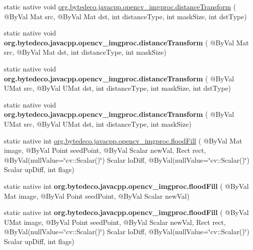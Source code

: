 \begin{DoxyCompactItemize}
\item 
static native void \hyperlink{group__imgproc__misc_ga8d767320bf0a4f3bbeebe751dbd2f3d7}{org.\+bytedeco.\+javacpp.\+opencv\+\_\+imgproc.\+distance\+Transform} ( @By\+Val Mat src, @By\+Val Mat dst, int distance\+Type, int mask\+Size, int dst\+Type)
\item 
\mbox{\label{group__imgproc__misc_gaafb2648fb2ef6bd1744373b552d73481}} 
static native void {\bfseries org.\+bytedeco.\+javacpp.\+opencv\+\_\+imgproc.\+distance\+Transform} ( @By\+Val Mat src, @By\+Val Mat dst, int distance\+Type, int mask\+Size)
\item 
\mbox{\label{group__imgproc__misc_gaa9ce9c56bdadbeb9f96047d6fc0ccaa7}} 
static native void {\bfseries org.\+bytedeco.\+javacpp.\+opencv\+\_\+imgproc.\+distance\+Transform} ( @By\+Val U\+Mat src, @By\+Val U\+Mat dst, int distance\+Type, int mask\+Size, int dst\+Type)
\item 
\mbox{\label{group__imgproc__misc_ga7033711a6d14a8d8e102fe9e79a7d4da}} 
static native void {\bfseries org.\+bytedeco.\+javacpp.\+opencv\+\_\+imgproc.\+distance\+Transform} ( @By\+Val U\+Mat src, @By\+Val U\+Mat dst, int distance\+Type, int mask\+Size)
\item 
static native int \hyperlink{group__imgproc__misc_gacd62f4ba0b1bf1f4664bfd1a3dd1bd08}{org.\+bytedeco.\+javacpp.\+opencv\+\_\+imgproc.\+flood\+Fill} ( @By\+Val Mat image, @By\+Val Point seed\+Point, @By\+Val Scalar new\+Val, Rect rect, @By\+Val(null\+Value=\char`\"{}cv\+::\+Scalar()\char`\"{}) Scalar lo\+Diff, @By\+Val(null\+Value=\char`\"{}cv\+::\+Scalar()\char`\"{}) Scalar up\+Diff, int flags)
\item 
\mbox{\label{group__imgproc__misc_ga77f9a45a75b473ba1e5969b6a3cf2a9f}} 
static native int {\bfseries org.\+bytedeco.\+javacpp.\+opencv\+\_\+imgproc.\+flood\+Fill} ( @By\+Val Mat image, @By\+Val Point seed\+Point, @By\+Val Scalar new\+Val)
\item 
\mbox{\label{group__imgproc__misc_gad2faadef83d138979a03da751e0eea87}} 
static native int {\bfseries org.\+bytedeco.\+javacpp.\+opencv\+\_\+imgproc.\+flood\+Fill} ( @By\+Val U\+Mat image, @By\+Val Point seed\+Point, @By\+Val Scalar new\+Val, Rect rect, @By\+Val(null\+Value=\char`\"{}cv\+::\+Scalar()\char`\"{}) Scalar lo\+Diff, @By\+Val(null\+Value=\char`\"{}cv\+::\+Scalar()\char`\"{}) Scalar up\+Diff, int flags)

\end{DoxyCompactItemize}
